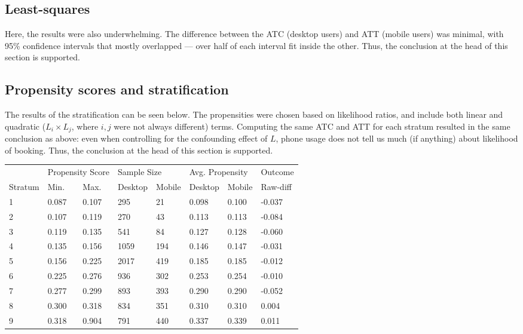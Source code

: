 \documentclass{article}
\begin{document}
\subsection{Least-squares}

Here, the results were also underwhelming.  The difference between the ATC
(desktop users) and ATT (mobile users) was minimal, with 95\% confidence
intervals that mostly overlapped --- over half of each interval fit inside the
other.  Thus, the conclusion at the head of this section is supported.

\subsection{Propensity scores and stratification}

The results of the stratification can be seen below.  The propensities were
chosen based on likelihood ratios, and include both linear and quadratic
($L_i\times L_j$, where $i,j$ were not always different) terms.  Computing the
same ATC and ATT for each stratum resulted in the same conclusion as above: even
when controlling for the confounding effect of $L$, phone usage does not tell us
much (if anything) about likelihood of booking.  Thus, the conclusion at the
head of this section is supported.

{
  \footnotesize
\begin{tabular}{llllllll}
  &
  \multicolumn{2}{l}{Propensity Score} &
  \multicolumn{2}{l}{Sample Size} &
  \multicolumn{2}{l}{Avg. Propensity} &
  Outcome\\
  Stratum & Min. & Max. & Desktop & Mobile & Desktop & Mobile & Raw-diff \\
  \hline
  1 & 0.087 & 0.107 & 295 & 21 & 0.098 & 0.100 & -0.037 \\
  2 & 0.107 & 0.119 & 270 & 43 & 0.113 & 0.113 & -0.084 \\
  3 & 0.119 & 0.135 & 541 & 84 & 0.127 & 0.128 & -0.060 \\
  4 & 0.135 & 0.156 & 1059 & 194 & 0.146 & 0.147 & -0.031 \\
  5 & 0.156 & 0.225 & 2017 & 419 & 0.185 & 0.185 & -0.012 \\
  6 & 0.225 & 0.276 & 936 & 302 & 0.253 & 0.254 & -0.010 \\
  7 & 0.277 & 0.299 & 893 & 393 & 0.290 & 0.290 & -0.052 \\
  8 & 0.300 & 0.318 & 834 & 351 & 0.310 & 0.310 & 0.004 \\
  9 & 0.318 & 0.904 & 791 & 440 & 0.337 & 0.339 & 0.011 \\
\end{tabular}
}
\end{document}
